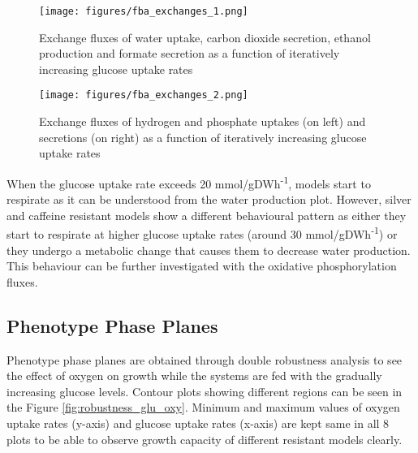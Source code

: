 \begin{figure}[H]
  \begin{center}
  \texttt{[image: figures/fba\_exchanges\_1.png]}
  \caption[Exchange fluxes of water, carbon dioxide, ethanol and formate secretion as a function of iteratively increasing glucose uptake rates]{Exchange fluxes of water uptake, carbon dioxide secretion, ethanol production and formate secretion as a function of iteratively increasing glucose uptake rates}
  \label{fig:fba_exchanges_1}
  \end{center}
  \end{figure}
\vspace{-1.0cm}

\begin{figure}[H]
  \begin{center}
  \texttt{[image: figures/fba\_exchanges\_2.png]}
  \caption[Exchange fluxes of hydrogen and phosphate uptakes (on the left) and secretions (on the right) as a function of iteratively increasing glucose uptake rates]{Exchange fluxes of hydrogen and phosphate uptakes (on left) and secretions (on right) as a function of iteratively increasing glucose uptake rates}
  \label{fig:fba_exchanges_2}
  \end{center}
  \end{figure}
\vspace{-1.0cm}

When the glucose uptake rate exceeds 20 mmol/gDWh\textsuperscript{-1}, models start to respirate as it can be understood from the water production plot. However, silver and caffeine resistant models show a different behavioural pattern as either they start to respirate at higher glucose uptake rates (around 30 mmol/gDWh\textsuperscript{-1}) or they undergo a metabolic change that causes them to decrease water production. This behaviour can be further  investigated with the oxidative phosphorylation fluxes.


\subsection{Phenotype Phase Planes}

Phenotype phase planes are obtained through double robustness analysis to see the effect of oxygen on growth while the systems are fed with the gradually increasing glucose levels. Contour plots showing different regions can be seen in the Figure \ref{fig:robustness_glu_oxy}. Minimum and maximum values of oxygen uptake rates (y-axis) and glucose uptake rates (x-axis) are kept same in all 8 plots to be able to observe growth capacity of different resistant models clearly.

